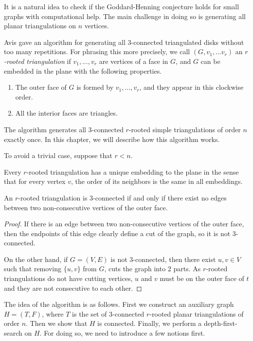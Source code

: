 It is a natural idea to check if the Goddard-Henning conjecture holds for small graphs with
computational help. The main challenge in doing so is generating all planar triangulations
on $n$ vertices.

Avis \cite{algorithm} gave an algorithm for generating all $3$-connected triangulated disks without
too many repetitions. For phrasing this more precisely, we call $(G, v_1, \dots v_r)$
an \emph{$r$-rooted triangulation} if $v_1, \dots, v_r$ are vertices of a face in $G$, and $G$
can be embedded in the plane with the following properties.

\begin{enumerate}
  \item The outer face of $G$ is formed by $v_1, \dots, v_r$, and they appear in
  this clockwise order.
  \item All the interior faces are triangles.
\end{enumerate}

The algorithm generates all $3$-connected $r$-rooted simple triangulations of order $n$ exactly once.
In this chapter, we will describe how this algorithm works.

To avoid a trivial case, suppose that $r < n$.

\begin{remark}
  Every $r$-rooted triangulation has a unique embedding to the plane in the sense that
  for every vertex $v$, the order of its neighbors is the same in all embeddings.
\end{remark}

\begin{claim} \label{c:3conn}
  An $r$-rooted triangulation is $3$-connected if and only if there exist no edges
  between two non-consecutive vertices of the outer face.
\end{claim}
\begin{proof}
  If there is an edge between two non-consecutive vertices of the outer face, then
  the endpoints of this edge clearly define a cut of the graph, so it is not $3$-connected.

  On the other hand, if $G = (V, E)$ is not $3$-connected, then there exist $u, v \in V$ such that
  removing $\{u, v\}$ from $G$, cuts the graph into $2$ parts. As $r$-rooted triangulations
  do not have cutting vertices, $u$ and $v$ must be on the outer face of $t$ and they
  are not consecutive to each other.
\end{proof}

The idea of the algorithm is as follows. First we construct an auxiliary graph $H = (T, F)$, where
$T$ is the set of $3$-connected $r$-rooted planar triangulations of order $n$. Then we
show that $H$ is connected. Finally, we perform a depth-first-search on $H$. For doing so,
we need to introduce a few notions first.


